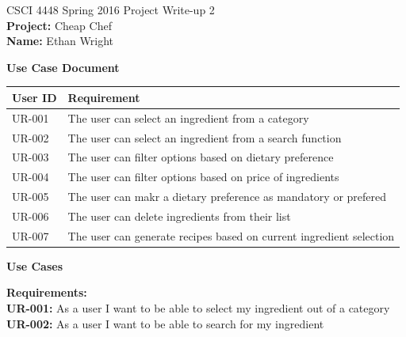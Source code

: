 \documentclass[12pt]{article}
\begin{document}
CSCI 4448 Spring 2016 \hfill Project Write-up 2\\
\textbf{Project: } Cheap Chef \\
\textbf{Name: } Ethan Wright \\


\hrulefill
\begin{center}
  \textbf{Use Case Document}
  \begin{tabular}{l  l}
    \textbf{User ID} & \textbf{Requirement} \\ \hline \rowcolor[gray]{.95}
    UR-001 & The user can select an ingredient from a category \\
    UR-002 & The user can select an ingredient from a search function \\ \rowcolor[gray]{.95}
    UR-003 & The user can filter options based on dietary preference \\ 
    UR-004 & The user can filter options based on price of ingredients \\ \rowcolor[gray]{.95}
    UR-005 & The user can makr a dietary preference as mandatory or prefered \\
    UR-006 & The user can delete ingredients from their list \\ \rowcolor[gray]{.95}
    UR-007 & The user can generate recipes based on current ingredient selection \\ 
  \end{tabular}
\end{center}
\newpage
\begin{center}
  \textbf{Use Cases}
\end{center}
\textbf{Requirements: } \\
\textbf{UR-001: } As a user I want to be able to select my ingredient out of a category \\
\textbf{UR-002: } As a user I want to be able to search for my ingredient \\ 
\vspace{1cm}
\end{document}
